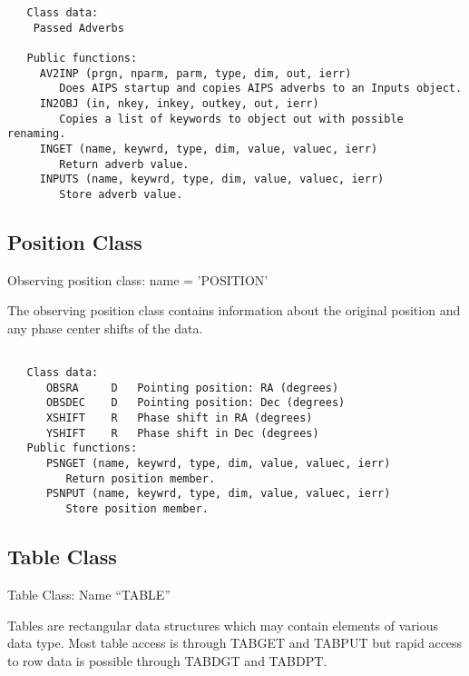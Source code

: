 {\small\begin{verbatim}
   Class data:
    Passed Adverbs

   Public functions:
     AV2INP (prgn, nparm, parm, type, dim, out, ierr)
        Does AIPS startup and copies AIPS adverbs to an Inputs object.
     IN2OBJ (in, nkey, inkey, outkey, out, ierr)
        Copies a list of keywords to object out with possible renaming.
     INGET (name, keywrd, type, dim, value, valuec, ierr)
        Return adverb value.
     INPUTS (name, keywrd, type, dim, value, valuec, ierr)
        Store adverb value.
\end{verbatim}}

\subsection{Position Class}
   Observing position class: name = 'POSITION'

   The observing position class contains information about the
original position and any phase center shifts of the data.
{\small\begin{verbatim}

   Class data:
      OBSRA     D   Pointing position: RA (degrees)
      OBSDEC    D   Pointing position: Dec (degrees)
      XSHIFT    R   Phase shift in RA (degrees)
      YSHIFT    R   Phase shift in Dec (degrees)
   Public functions:
      PSNGET (name, keywrd, type, dim, value, valuec, ierr)
         Return position member.
      PSNPUT (name, keywrd, type, dim, value, valuec, ierr)
         Store position member.
\end{verbatim}}
\subsection{Table Class}

   Table Class: Name ``TABLE''

   Tables are rectangular data structures which may contain elements of
various data type.  Most table access is through TABGET and TABPUT
but rapid access to row data is possible through TABDGT and TABDPT.

